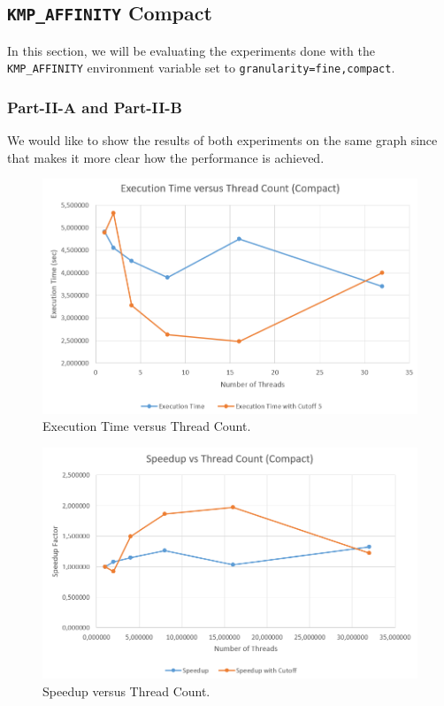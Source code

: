 \documentclass[11pt,reqno]{amsart}
\newcommand{\code}[1]{\texttt{#1}}
\begin{document}
\subsection{\code{KMP\_AFFINITY} Compact}
In this section, we will be evaluating the experiments done with the \code{KMP\_AFFINITY} environment variable set to \code{granularity=fine,compact}. 

\subsubsection{Part-II-A and Part-II-B}
We would like to show the results of both experiments on the same graph since that makes it more clear how the performance is achieved.

\begin{figure}[h]
\centering
\includegraphics[width=0.75\linewidth]{exectime_A_B_compact.png}
\caption{Execution Time versus Thread Count.}
\label{fig:exec_A_B_c}
\end{figure}

\begin{figure}[h]
\centering
\includegraphics[width=0.75\linewidth]{speedup_A_B_compact.png}
\caption{Speedup versus Thread Count.}
\label{fig:spd_A_B_c}
\end{figure}
\end{document}
